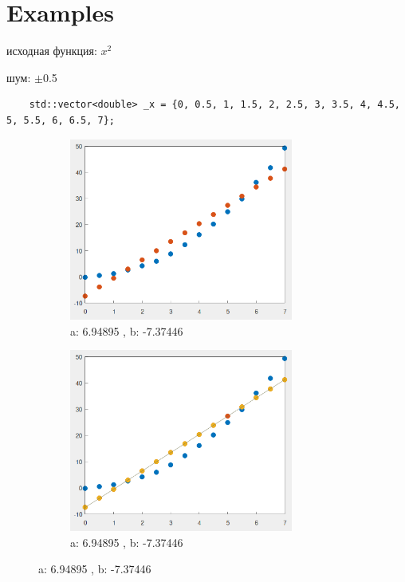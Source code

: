 \section{Examples}
исходная функция: $x^2$\par
шум: $\pm$0.5\\
\small
\begin{verbatim}
    std::vector<double> _x = {0, 0.5, 1, 1.5, 2, 2.5, 3, 3.5, 4, 4.5, 5, 5.5, 6, 6.5, 7};
\end{verbatim}
\begin{figure}[h]
    \begin{subfigure}{0.5\textwidth}
        \includegraphics[width=0.9\linewidth, height=6cm]{img/graphic_1}
        \caption{a: 6.94895 , b: -7.37446}
    \end{subfigure}
    \begin{subfigure}{0.5\textwidth}
        \includegraphics[width=0.9\linewidth, height=6cm]{img/graphic_2}
        \caption{a: 6.94895 , b: -7.37446}
    \end{subfigure}
\end{figure}


